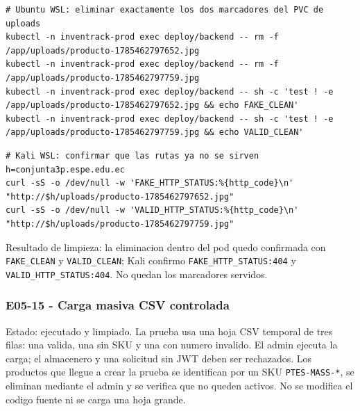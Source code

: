 \begin{tcolorbox}[codebox]
\begin{Verbatim}[fontsize=\scriptsize,breaklines=true,breakanywhere=true]
# Ubuntu WSL: eliminar exactamente los dos marcadores del PVC de uploads
kubectl -n inventrack-prod exec deploy/backend -- rm -f /app/uploads/producto-1785462797652.jpg
kubectl -n inventrack-prod exec deploy/backend -- rm -f /app/uploads/producto-1785462797759.jpg
kubectl -n inventrack-prod exec deploy/backend -- sh -c 'test ! -e /app/uploads/producto-1785462797652.jpg && echo FAKE_CLEAN'
kubectl -n inventrack-prod exec deploy/backend -- sh -c 'test ! -e /app/uploads/producto-1785462797759.jpg && echo VALID_CLEAN'
\end{Verbatim}
\end{tcolorbox}

\begin{tcolorbox}[codebox]
\begin{Verbatim}[fontsize=\scriptsize,breaklines=true,breakanywhere=true]
# Kali WSL: confirmar que las rutas ya no se sirven
h=conjunta3p.espe.edu.ec
curl -sS -o /dev/null -w 'FAKE_HTTP_STATUS:%{http_code}\n' "http://$h/uploads/producto-1785462797652.jpg"
curl -sS -o /dev/null -w 'VALID_HTTP_STATUS:%{http_code}\n' "http://$h/uploads/producto-1785462797759.jpg"
\end{Verbatim}
\end{tcolorbox}

Resultado de limpieza: la eliminacion dentro del pod quedo confirmada con \texttt{FAKE\_CLEAN} y \texttt{VALID\_CLEAN}; Kali confirmo \texttt{FAKE\_HTTP\_STATUS:404} y \texttt{VALID\_HTTP\_STATUS:404}. No quedan los marcadores servidos.

\subsubsection{E05-15 - Carga masiva CSV controlada}\label{e05-15---carga-masiva-csv-controlada}

Estado: ejecutado y limpiado. La prueba usa una hoja CSV temporal de tres filas: una valida, una sin SKU y una con numero invalido. El admin ejecuta la carga; el almacenero y una solicitud sin JWT deben ser rechazados. Los productos que llegue a crear la prueba se identifican por un SKU \texttt{PTES-MASS-*}, se eliminan mediante el admin y se verifica que no queden activos. No se modifica el codigo fuente ni se carga una hoja grande.

